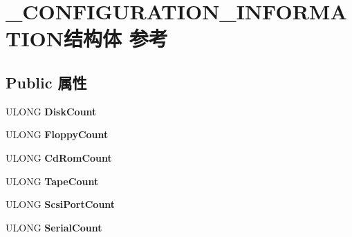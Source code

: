 \hypertarget{struct___c_o_n_f_i_g_u_r_a_t_i_o_n___i_n_f_o_r_m_a_t_i_o_n}{}\section{\+\_\+\+C\+O\+N\+F\+I\+G\+U\+R\+A\+T\+I\+O\+N\+\_\+\+I\+N\+F\+O\+R\+M\+A\+T\+I\+O\+N结构体 参考}
\label{struct___c_o_n_f_i_g_u_r_a_t_i_o_n___i_n_f_o_r_m_a_t_i_o_n}
\subsection*{Public 属性}
\begin{DoxyCompactItemize}
\item 
\mbox{\label{struct___c_o_n_f_i_g_u_r_a_t_i_o_n___i_n_f_o_r_m_a_t_i_o_n_afe3896a85ed932a0c4114c67dbba86f7}} 
U\+L\+O\+NG {\bfseries Disk\+Count}
\item 
\mbox{\label{struct___c_o_n_f_i_g_u_r_a_t_i_o_n___i_n_f_o_r_m_a_t_i_o_n_acfccfbec7d81570e65fb90c4c2578581}} 
U\+L\+O\+NG {\bfseries Floppy\+Count}
\item 
\mbox{\label{struct___c_o_n_f_i_g_u_r_a_t_i_o_n___i_n_f_o_r_m_a_t_i_o_n_ad195d6872ffc89f8c44fd7999fdbf090}} 
U\+L\+O\+NG {\bfseries Cd\+Rom\+Count}
\item 
\mbox{\label{struct___c_o_n_f_i_g_u_r_a_t_i_o_n___i_n_f_o_r_m_a_t_i_o_n_ab64a6e4f03224da1c5b02fad4743dbd8}} 
U\+L\+O\+NG {\bfseries Tape\+Count}
\item 
\mbox{\label{struct___c_o_n_f_i_g_u_r_a_t_i_o_n___i_n_f_o_r_m_a_t_i_o_n_adc5df7e242c41ccf2ffe28e1e2b9eef1}} 
U\+L\+O\+NG {\bfseries Scsi\+Port\+Count}
\item 
\mbox{\label{struct___c_o_n_f_i_g_u_r_a_t_i_o_n___i_n_f_o_r_m_a_t_i_o_n_a6961891a28a775859dc636f26bfab58b}} 
U\+L\+O\+NG {\bfseries Serial\+Count}

\end{DoxyCompactItemize}

